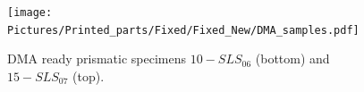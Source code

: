 \documentclass[a4paper]{article}
\begin{document}
%

        \begin{figure}[H]
            \centering
            \texttt{[image: Pictures/Printed\_parts/Fixed/Fixed\_New/DMA\_samples.pdf]}
            \caption{DMA ready prismatic specimens $10-SLS_{06}$ (bottom) and $15-SLS_{07}$ (top).}
            \label{fig:printed_specimens_DMA}
        \end{figure}
\end{document}
